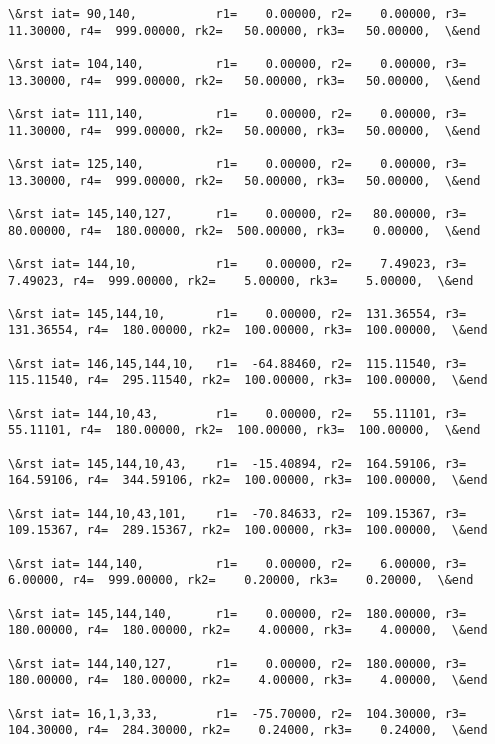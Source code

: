 \documentclass[11pt]{article}
\begin{document}
\begin{Verbatim}[commandchars=\\\{\}]
\&rst iat= 90,140,           r1=    0.00000, r2=    0.00000, r3=   11.30000, r4=  999.00000, rk2=   50.00000, rk3=   50.00000,  \&end

\&rst iat= 104,140,          r1=    0.00000, r2=    0.00000, r3=   13.30000, r4=  999.00000, rk2=   50.00000, rk3=   50.00000,  \&end

\&rst iat= 111,140,          r1=    0.00000, r2=    0.00000, r3=   11.30000, r4=  999.00000, rk2=   50.00000, rk3=   50.00000,  \&end

\&rst iat= 125,140,          r1=    0.00000, r2=    0.00000, r3=   13.30000, r4=  999.00000, rk2=   50.00000, rk3=   50.00000,  \&end

\&rst iat= 145,140,127,      r1=    0.00000, r2=   80.00000, r3=   80.00000, r4=  180.00000, rk2=  500.00000, rk3=    0.00000,  \&end

\&rst iat= 144,10,           r1=    0.00000, r2=    7.49023, r3=    7.49023, r4=  999.00000, rk2=    5.00000, rk3=    5.00000,  \&end

\&rst iat= 145,144,10,       r1=    0.00000, r2=  131.36554, r3=  131.36554, r4=  180.00000, rk2=  100.00000, rk3=  100.00000,  \&end

\&rst iat= 146,145,144,10,   r1=  -64.88460, r2=  115.11540, r3=  115.11540, r4=  295.11540, rk2=  100.00000, rk3=  100.00000,  \&end

\&rst iat= 144,10,43,        r1=    0.00000, r2=   55.11101, r3=   55.11101, r4=  180.00000, rk2=  100.00000, rk3=  100.00000,  \&end

\&rst iat= 145,144,10,43,    r1=  -15.40894, r2=  164.59106, r3=  164.59106, r4=  344.59106, rk2=  100.00000, rk3=  100.00000,  \&end

\&rst iat= 144,10,43,101,    r1=  -70.84633, r2=  109.15367, r3=  109.15367, r4=  289.15367, rk2=  100.00000, rk3=  100.00000,  \&end

\&rst iat= 144,140,          r1=    0.00000, r2=    6.00000, r3=    6.00000, r4=  999.00000, rk2=    0.20000, rk3=    0.20000,  \&end

\&rst iat= 145,144,140,      r1=    0.00000, r2=  180.00000, r3=  180.00000, r4=  180.00000, rk2=    4.00000, rk3=    4.00000,  \&end

\&rst iat= 144,140,127,      r1=    0.00000, r2=  180.00000, r3=  180.00000, r4=  180.00000, rk2=    4.00000, rk3=    4.00000,  \&end

\&rst iat= 16,1,3,33,        r1=  -75.70000, r2=  104.30000, r3=  104.30000, r4=  284.30000, rk2=    0.24000, rk3=    0.24000,  \&end


\end{Verbatim}
\end{document}
